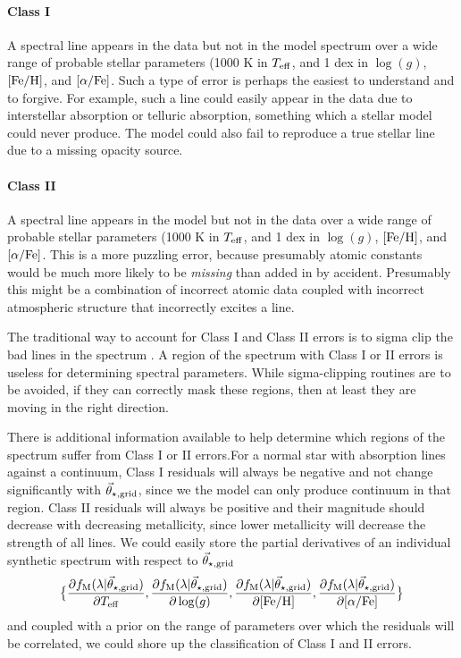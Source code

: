 \documentclass[preprint]{aastex} %
\newcommand{\vt}{\vec{\theta}}
\newcommand{\vg}{\vt_{\star, {\rm grid}}}
\newcommand{\fM}{f_{\rm M}}
\newcommand{\Z}{[{\rm Fe}/{\rm H}]}
\newcommand{\A}{[\alpha/{\rm Fe}]}
\begin{document}
\paragraph{Class I} A spectral line appears in the data but not in the model spectrum over a wide range of probable stellar parameters (1000 K in $T_{\rm eff}$, and 1 dex in $\log(g)$, $\Z$, and $\A$. Such a type of error is perhaps the easiest to understand and to forgive. For example, such a line could easily appear in the data due to interstellar absorption or telluric absorption, something which a stellar model could never produce. The model could also fail to reproduce a true stellar line due to a missing opacity source.

\paragraph{Class II} A spectral line appears in the model but not in the data over a wide range of probable stellar parameters (1000 K in $T_{\rm eff}$, and 1 dex in $\log(g)$, $\Z$, and $\A$. This is a more puzzling error, because presumably atomic constants would be much more likely to be \emph{missing} than added in by accident. Presumably this might be a combination of incorrect atomic data coupled with incorrect atmospheric structure that incorrectly excites a line.

The traditional way to account for Class I and Class II errors is to sigma clip the bad lines in the spectrum \citep{kpb+09, mga13}. A region of the spectrum with Class I or II errors is useless for determining spectral parameters. While sigma-clipping routines are to be avoided, if they can correctly mask these regions, then at least they are moving in the right direction.

There is additional information available to help determine which regions of the spectrum suffer from Class I or II errors.For a normal star with absorption lines against a continuum, Class I residuals will always be negative and not change significantly with $\vg$, since we the model can only produce continuum in that region. Class II residuals will always be positive and their magnitude should decrease with decreasing metallicity, since lower metallicity will decrease the strength of all lines. We could easily store the partial derivatives of an individual synthetic spectrum with respect to $\vg$
\begin{equation}
  \bigl \{ \frac{\partial \fM(\lambda | \vg)}{ \partial T_{\rm eff}}, \frac{\partial \fM(\lambda | \vg)}{ \partial \log(g)}, \frac{\partial \fM(\lambda | \vg)}{ \partial \Z}, \frac{\partial \fM(\lambda | \vg)}{ \partial \A} \bigr \}
  \label{eqn:derivative}
\end{equation}
and coupled with a prior on the range of parameters over which the residuals will be correlated, we could shore up the classification of Class I and II errors. 
\end{document}
